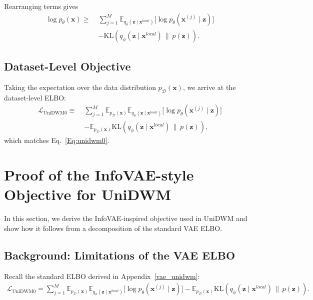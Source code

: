\documentclass{article}
\theoremstyle{plain}
\theoremstyle{definition}
\theoremstyle{remark}
\begin{document}
Rearranging terms gives
\[
\begin{aligned}
\log p_\theta(\mathbf{x})
\ge\;&
\sum_{j=1}^{M}
\mathbb{E}_{q_\phi(\mathbf{z} \mid \mathbf{x}^{local})}
\big[ \log p_\theta(\boldsymbol{x}^{(j)} \mid \mathbf{z}) \big] \\
&-
\mathrm{KL}\!\left(
q_\phi(\mathbf{z} \mid \mathbf{x}^{local})
\,\|\, p(\mathbf{z})
\right).
\end{aligned}
\]

\subsection{Dataset-Level Objective}

Taking the expectation over the data distribution $p_{\mathcal{D}}(\mathbf{x})$,
we arrive at the dataset-level ELBO:
\[
\begin{aligned}
\mathcal{L}_{\mathrm{UniDWM0}} \equiv\;&
{\textstyle \sum_{j=1}^{M}}
\mathbb{E}_{p_{\mathcal{D}}(\mathbf{x})}
\mathbb{E}_{q_\phi(\mathbf{z} \mid \mathbf{x}^{local})}
\big[ \log p_\theta(\boldsymbol{x}^{(j)} \mid \mathbf{z}) \big] \\
&-
\mathbb{E}_{p_{\mathcal{D}}(\mathbf{x})}
\mathrm{KL}\!\left(
q_\phi(\mathbf{z} \mid \mathbf{x}^{local})
\,\|\, p(\mathbf{z})
\right),
\end{aligned}
\]
which matches Eq.~\ref{Eq:unidwm0}.

\section{Proof of the InfoVAE-style Objective for UniDWM}
\label{infovae_unidwm}

In this section, we derive the InfoVAE-inspired objective used in UniDWM and
show how it follows from a decomposition of the standard VAE ELBO.

\subsection{Background: Limitations of the VAE ELBO}

Recall the standard ELBO derived in Appendix~\ref{vae_unidwm}:
\[
\begin{aligned}
\mathcal{L}_{\mathrm{UniDWM0}} =
{\textstyle \sum_{j=1}^{M}}
\mathbb{E}_{p_{\mathcal{D}}(\mathbf{x})}
\mathbb{E}_{q_\phi(\mathbf{z} \mid \mathbf{x}^{local})}
\big[ \log p_\theta(\boldsymbol{x}^{(j)} \mid \mathbf{z}) \big]
-
\mathbb{E}_{p_{\mathcal{D}}(\mathbf{x})}
\mathrm{KL}\!\left(
q_\phi(\mathbf{z} \mid \mathbf{x}^{local})
\,\|\, p(\mathbf{z})
\right).
\end{aligned}
\]
\end{document}

